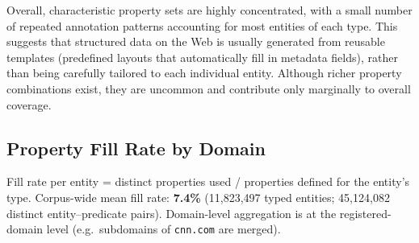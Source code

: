 \documentclass[11pt,a4paper]{article}
\begin{document}
Overall, characteristic property sets are highly concentrated, with a small
number of repeated annotation patterns accounting for most entities of each
type. This suggests that structured data on the Web is usually generated from
reusable templates (predefined layouts that automatically fill in metadata
fields), rather than being carefully tailored to each individual entity.
Although richer property combinations exist, they are uncommon and contribute
only marginally to overall coverage.


\subsection{Property Fill Rate by Domain}

Fill rate per entity = distinct properties used / properties defined for the
entity's type.  Corpus-wide mean fill rate: \textbf{7.4\%}
(11{,}823{,}497 typed entities; 45{,}124{,}082 distinct entity--predicate pairs).
Domain-level aggregation is at the registered-domain level (e.g.\ subdomains of
\texttt{cnn.com} are merged).
\end{document}
